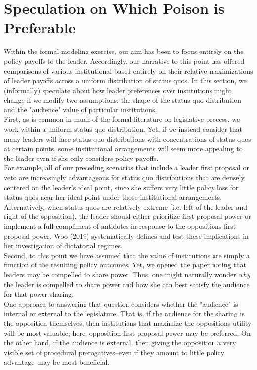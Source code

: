 \documentclass[12pt]{article}
\theoremstyle{plain}		      \newtheorem{assn}{Assumption}
\theoremstyle{plain}		      \newtheorem{prop}{Proposition}
\theoremstyle{plain}		      \newtheorem{lemma}{Lemma}
\theoremstyle{plain}	          \newtheorem{imp}{Implication}
\theoremstyle{plain}	          \newtheorem{hyp}{Hypothesis}
\theoremstyle{definition}		  \newtheorem{defn}{Definition}
\theoremstyle{remark}	          \newtheorem{rem}{Remark}
\theoremstyle{definition}         \newtheorem{case}{Case}
\begin{document}
\section{Speculation on Which Poison is Preferable}
\indent Within the formal modeling exercise, our aim has been to focus entirely on the policy payoffs to the leader. Accordingly, our narrative to this point has offered comparisons of various institutional  based entirely on their relative maximizations of leader payoffs across a uniform distribution of status quos. In this section, we (informally) speculate about how leader preferences over institutions might change if we modify two assumptions: the shape of the status quo distribution and the "audience" value of particular institutions. 
\\
\indent First, as is common in much of the formal literature on legislative process, we work within a uniform status quo distribution. Yet, if we instead consider that many leaders will face status quo distributions with concentrations of status quos at certain points, some institutional arrangements will seem more appealing to the leader even if she only considers policy payoffs. 
\\
\indent For example, all of our preceding scenarios that include a leader first proposal or veto are increasingly advantageous for status quo distributions that are densely centered on the leader's ideal point, since she suffers very little policy loss for status quos near her ideal point under those institutional arrangements. Alternatively, when status quos are relatively extreme (i.e. left of the leader and right of the opposition), the leader should either prioritize first proposal power or implement a full compliment of antidotes in response to the oppositions first proposal power. Woo (2019) systematically defines and test these implications in her investigation of dictatorial regimes.
\\
\indent Second, to this point we have assumed that the value of institutions are simply a function of the resulting policy outcomes. Yet, we opened the paper noting that leaders may be compelled to share power. Thus, one might naturally wonder \textit{why} the leader is compelled to share power and how she can best satisfy the audience for that power sharing.
\\
\indent One approach to answering that question considers whether the "audience" is internal or external to the legislature. That is, if the audience for the sharing is the opposition themselves, then institutions that maximize the oppositions utility will be most valuable; here, opposition first proposal power may be preferred. On the other hand, if the audience is external, then giving the opposition a very visible set of procedural prerogatives--even if they amount to little policy advantage--may be most beneficial. 
\end{document}
